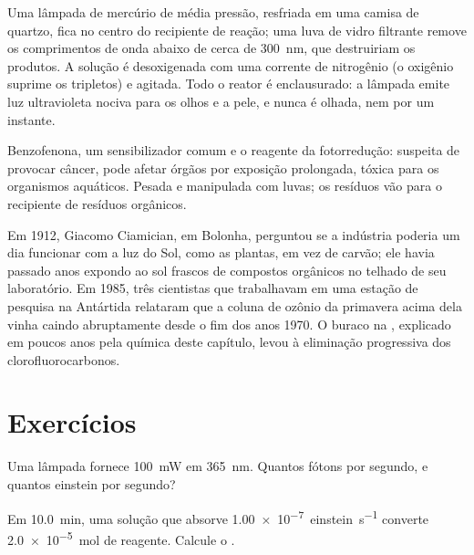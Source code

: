 \begin{inthelab}[Um fotorreator]
Uma lâmpada de mercúrio de média pressão, resfriada em uma camisa de quartzo,
fica no centro do recipiente de reação; uma luva de vidro filtrante remove os
comprimentos de onda abaixo de cerca de \qty{300}{nm}, que destruiriam os produtos.
A solução é desoxigenada com uma corrente de nitrogênio (o oxigênio suprime os
tripletos) e agitada. Todo o reator é enclausurado: a lâmpada emite luz
ultravioleta nociva para os olhos e a pele, e nunca é olhada, nem por um instante.
\end{inthelab}

\begin{safety}{}
Benzofenona, um sensibilizador comum e o reagente da fotorredução: suspeita de
provocar câncer, pode afetar órgãos por exposição prolongada, tóxica para os
organismos aquáticos. Pesada e manipulada com luvas; os resíduos vão para o
recipiente de resíduos orgânicos.
\end{safety}

\begin{history}
Em 1912, Giacomo Ciamician, em Bolonha, perguntou se a indústria poderia um dia
funcionar com a luz do Sol, como as plantas, em vez de carvão; ele havia passado
anos expondo ao sol frascos de compostos orgânicos no telhado de seu laboratório.
Em 1985, três cientistas que trabalhavam em uma estação de pesquisa na Antártida
relataram que a coluna de ozônio da primavera acima dela vinha caindo
abruptamente desde o fim dos anos 1970.
O buraco na , explicado em poucos anos pela química deste
capítulo, levou à eliminação progressiva dos clorofluorocarbonos.
\end{history}

\section{Exercícios}

\begin{exercise}[$\star$]\label{exo:b3:photochemistry:1}
Uma lâmpada fornece \qty{100}{mW} em \qty{365}{nm}. Quantos fótons por segundo, e
quantos einstein por segundo?
\end{exercise}

\begin{exercise}[$\star$]\label{exo:b3:photochemistry:2}
Em \qty{10.0}{min}, uma solução que absorve \qty{1.00e-7}{einstein.s^{-1}} converte
\qty{2.0e-5}{mol} de reagente. Calcule o .
\end{exercise}

